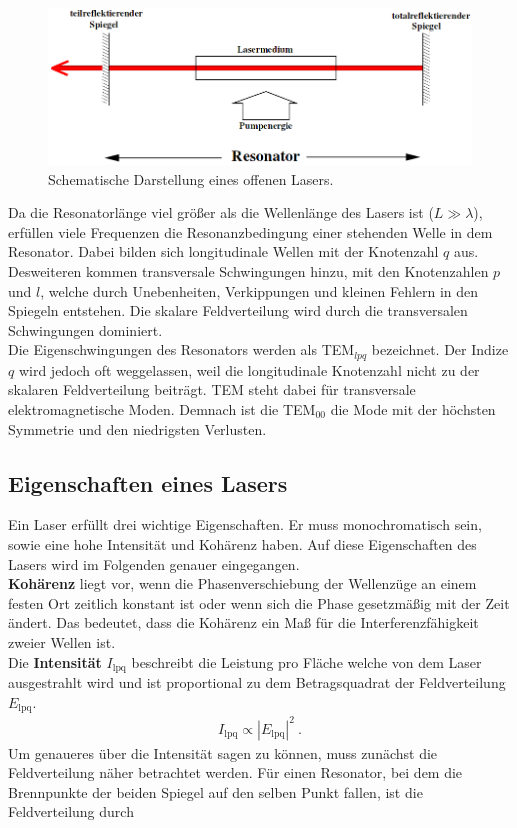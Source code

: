 \begin{figure}[H]
	\includegraphics[width=\linewidth]{Bilder/Resonator.png}
	\caption{Schematische Darstellung eines offenen Lasers. \cite{V61}}
	\label{fig:Laser}
\end{figure}

Da die Resonatorlänge viel größer als die Wellenlänge des Lasers ist ($L \gg \lambda$), erfüllen viele Frequenzen die Resonanzbedingung einer stehenden Welle in dem Resonator. Dabei bilden sich longitudinale Wellen mit der Knotenzahl $q$ aus. Desweiteren kommen transversale Schwingungen hinzu, mit den Knotenzahlen $p$ und $l$, welche durch Unebenheiten, Verkippungen und kleinen Fehlern in den Spiegeln entstehen. Die skalare Feldverteilung wird durch die transversalen Schwingungen dominiert. \\
Die Eigenschwingungen des Resonators werden als TEM$_{lpq}$ bezeichnet. Der Indize $q$ wird jedoch oft weggelassen, weil die longitudinale Knotenzahl nicht zu der skalaren Feldverteilung beiträgt. TEM steht dabei für transversale elektromagnetische Moden. Demnach ist die TEM$_{00}$ die Mode mit der höchsten Symmetrie und den niedrigsten Verlusten.

\subsection{Eigenschaften eines Lasers}
Ein Laser erfüllt drei wichtige Eigenschaften. Er muss monochromatisch sein, sowie eine hohe Intensität und Kohärenz haben. Auf diese Eigenschaften des Lasers wird im Folgenden genauer eingegangen. \\
\textbf{Kohärenz} liegt vor, wenn die Phasenverschiebung der Wellenzüge an einem festen Ort zeitlich konstant ist oder wenn sich die Phase gesetzmäßig mit der Zeit ändert.
Das bedeutet, dass die Kohärenz ein Maß für die Interferenzfähigkeit zweier Wellen ist. \\
Die \textbf{Intensität} $I_\text{lpq}$ beschreibt die Leistung pro Fläche welche von dem Laser ausgestrahlt wird und ist proportional zu dem Betragsquadrat der Feldverteilung $E_\text{lpq}$.
\begin{align*}
	I_\text{lpq} \propto |E_\text{lpq}|^2 \ .
\end{align*}
Um genaueres über die Intensität sagen zu können, muss zunächst die Feldverteilung näher betrachtet werden. Für einen Resonator, bei dem die Brennpunkte der beiden Spiegel auf den selben Punkt fallen, ist die Feldverteilung durch

